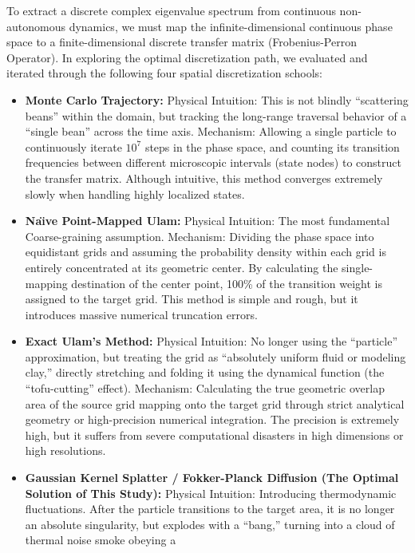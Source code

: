 \documentclass[fleqn,10pt]{wlscirep}
\begin{document}
To extract a discrete complex eigenvalue spectrum from continuous
non-autonomous dynamics, we must map the infinite-dimensional continuous
phase space to a finite-dimensional discrete transfer matrix
(Frobenius-Perron Operator). In exploring the optimal discretization
path, we evaluated and iterated through the following four spatial
discretization schools:

\begin{itemize}
\item
  \textbf{Monte Carlo Trajectory:} Physical Intuition: This is not
  blindly ``scattering beans'' within the domain, but tracking the
  long-range traversal behavior of a ``single bean'' across the time
  axis. Mechanism: Allowing a single particle to continuously iterate
  \(\text{10}^{\text{7}}\) steps in the phase space, and counting its
  transition frequencies between different microscopic intervals (state
  nodes) to construct the transfer matrix. Although intuitive, this
  method converges extremely slowly when handling highly localized
  states.
\item
  \textbf{Na\"\i{}ve Point-Mapped Ulam:} Physical Intuition: The most
  fundamental Coarse-graining assumption. Mechanism: Dividing the phase
  space into equidistant grids and assuming the probability density
  within each grid is entirely concentrated at its geometric center. By
  calculating the single-mapping destination of the center point, 100\%
  of the transition weight is assigned to the target grid. This method
  is simple and rough, but it introduces massive numerical truncation
  errors.
\item
  \textbf{Exact Ulam's Method:} Physical Intuition: No longer using the
  ``particle'' approximation, but treating the grid as ``absolutely
  uniform fluid or modeling clay,'' directly stretching and folding it
  using the dynamical function (the ``tofu-cutting'' effect). Mechanism:
  Calculating the true geometric overlap area of the source grid mapping
  onto the target grid through strict analytical geometry or
  high-precision numerical integration. The precision is extremely high,
  but it suffers from severe computational disasters in high dimensions
  or high resolutions.
\item
  \textbf{Gaussian Kernel Splatter / Fokker-Planck Diffusion (The
  Optimal Solution of This Study):} Physical Intuition: Introducing
  thermodynamic fluctuations. After the particle transitions to the
  target area, it is no longer an absolute singularity, but explodes
  with a ``bang,'' turning into a cloud of thermal noise smoke obeying a

\end{itemize}
\end{document}
